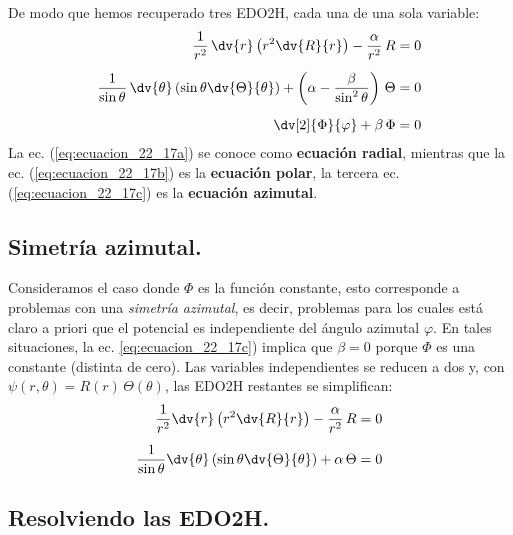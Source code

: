 De modo que hemos recuperado tres EDO2H, cada una de una sola variable:
\begin{align}
\dfrac{1}{r^{2}} \, \dv{r} \left( r^{2} \dv{R}{r} \right) - \dfrac{\alpha}{r^{2}} \, R &= 0 \label{eq:ecuacion_22_17a} \\[0.5em]
\dfrac{1}{\sin \theta} \, \dv{\theta} \left( \sin \theta \dv{\Theta}{\theta} \right) + \left( \alpha - \dfrac{\beta}{\sin^{2} \theta} \right) \, \Theta &= 0 \label{eq:ecuacion_22_17b} \\[0.5em]
\dv[2]{\Phi}{\varphi} + \beta \, \Phi &= 0 \label{eq:ecuacion_22_17c}
\end{align}
La ec. (\ref{eq:ecuacion_22_17a}) se conoce como \textbf{ecuación radial}, mientras que la ec. (\ref{eq:ecuacion_22_17b}) es la \textbf{ecuación polar}, la tercera ec. (\ref{eq:ecuacion_22_17c}) es la \textbf{ecuación azimutal}.

\subsection{Simetría azimutal.}

Consideramos el caso donde $\Phi$ es la función constante, esto corresponde a problemas con una \emph{simetría azimutal}, es decir, problemas para los cuales está claro a priori que el potencial es independiente del ángulo azimutal $\varphi$. En tales situaciones, la ec. \ref{eq:ecuacion_22_17c}) implica que $\beta = 0$ porque $\Phi$ es una constante (distinta de cero). Las variables independientes se reducen a dos y, con \break \hfill $\psi (r, \theta) = R (r) \, \Theta (\theta)$, las EDO2H restantes se simplifican:
\begin{align}
\begin{aligned}
\dfrac{1}{r^{2}} \dv{r} \left( r^{2} \dv{R}{r} \right) - \dfrac{\alpha}{r^{2}} \, R &= 0 \\[0.5em]
\dfrac{1}{\sin \theta} \dv{\theta} \left( \sin \theta \dv{\Theta}{\theta} \right) + \alpha \, \Theta &= 0
\end{aligned}
\label{eq:ecuacion_26_02}
\end{align}

\subsection{Resolviendo las EDO2H.}

